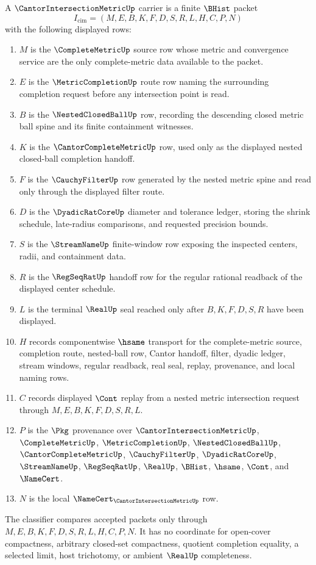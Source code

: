 \begin{definition}
\label{def:cantor-intersection-metric-carrier}
A $\CantorIntersectionMetricUp$ carrier is a finite $\BHist$ packet
$$
I_{\mathrm{cim}}=(M,E,B,K,F,D,S,R,L,H,C,P,N)
$$
with the following displayed rows:
\begin{enumerate}
\item $M$ is the $\CompleteMetricUp$ source row whose metric and convergence service are the only complete-metric data available to the packet.
\item $E$ is the $\MetricCompletionUp$ route row naming the surrounding completion request before any intersection point is read.
\item $B$ is the $\NestedClosedBallUp$ row, recording the descending closed metric ball spine and its finite containment witnesses.
\item $K$ is the $\CantorCompleteMetricUp$ row, used only as the displayed nested closed-ball completion handoff.
\item $F$ is the $\CauchyFilterUp$ row generated by the nested metric spine and read only through the displayed filter route.
\item $D$ is the $\DyadicRatCoreUp$ diameter and tolerance ledger, storing the shrink schedule, late-radius comparisons, and requested precision bounds.
\item $S$ is the $\StreamNameUp$ finite-window row exposing the inspected centers, radii, and containment data.
\item $R$ is the $\RegSeqRatUp$ handoff row for the regular rational readback of the displayed center schedule.
\item $L$ is the terminal $\RealUp$ seal reached only after $B,K,F,D,S,R$ have been displayed.
\item $H$ records componentwise $\hsame$ transport for the complete-metric source, completion route, nested-ball row, Cantor handoff, filter, dyadic ledger, stream windows, regular readback, real seal, replay, provenance, and local naming rows.
\item $C$ records displayed $\Cont$ replay from a nested metric intersection request through $M,E,B,K,F,D,S,R,L$.
\item $P$ is the $\Pkg$ provenance over $\CantorIntersectionMetricUp$, $\CompleteMetricUp$, $\MetricCompletionUp$, $\NestedClosedBallUp$, $\CantorCompleteMetricUp$, $\CauchyFilterUp$, $\DyadicRatCoreUp$, $\StreamNameUp$, $\RegSeqRatUp$, $\RealUp$, $\BHist$, $\hsame$, $\Cont$, and $\NameCert$.
\item $N$ is the local $\NameCert_{\CantorIntersectionMetricUp}$ row.
\end{enumerate}
The classifier compares accepted packets only through $M,E,B,K,F,D,S,R,L,H,C,P,N$. It has no coordinate for open-cover compactness, arbitrary closed-set compactness, quotient completion equality, a selected limit, host trichotomy, or ambient $\RealUp$ completeness.
\end{definition}

